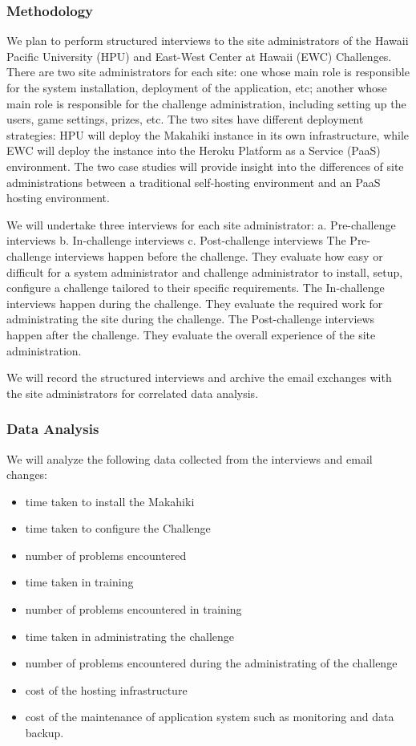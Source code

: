\documentclass[11pt]{article}
\begin{document}
\subsubsection{Methodology}

We plan to perform structured interviews to the site administrators of the Hawaii Pacific University (HPU) and East-West Center at Hawaii (EWC) Challenges. There are two site administrators for each site: one whose main role is responsible for the system installation, deployment of the application, etc; another whose main role is responsible for the challenge administration, including setting up the users, game settings, prizes, etc. The two sites have different deployment strategies: HPU will deploy the Makahiki instance in its own infrastructure, while EWC will deploy the instance into the Heroku Platform as a Service (PaaS) environment. The two case studies will provide insight into the differences of site administrations between a traditional self-hosting environment and an PaaS hosting environment.

We will undertake three interviews for each site administrator:
a. Pre-challenge interviews
b. In-challenge interviews
c. Post-challenge interviews
The Pre-challenge interviews happen before the challenge. They evaluate how easy or difficult for a system administrator and challenge administrator to install, setup, configure a challenge tailored to their specific requirements. The In-challenge interviews happen during the challenge. They evaluate the required work for administrating the site during the challenge. The Post-challenge interviews happen after the challenge. They evaluate the overall experience of the site administration.

We will record the structured interviews and archive the email exchanges with the site administrators for correlated data analysis.

\subsubsection{Data Analysis}
We will analyze the following data collected from the interviews and email changes:
\begin{itemize}
 \item time taken to install the Makahiki
 \item time taken to configure the Challenge
 \item number of problems encountered
 \item time taken in training
 \item number of problems encountered in training
 \item time taken in administrating the challenge
 \item number of problems encountered during the administrating of the challenge
 \item cost of the hosting infrastructure
 \item cost of the maintenance of application system such as monitoring and data backup.
\end{itemize}
\end{document}
